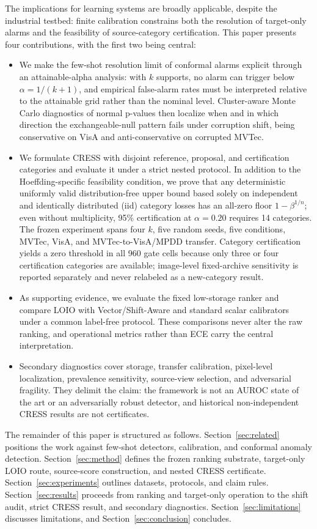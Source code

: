 The implications for learning systems are broadly applicable, despite the industrial testbed: finite calibration constrains both the resolution of target-only alarms and the feasibility of source-category certification. This paper presents four contributions, with the first two being central:
\begin{itemize}
    \item We make the few-shot resolution limit of conformal alarms explicit through an attainable-alpha analysis: with $k$ supports, no alarm can trigger below $\alpha=1/(k{+}1)$, and empirical false-alarm rates must be interpreted relative to the attainable grid rather than the nominal level. Cluster-aware Monte Carlo diagnostics of normal p-values then localize when and in which direction the exchangeable-null pattern fails under corruption shift, being conservative on VisA and anti-conservative on corrupted MVTec.
    \item We formulate CRESS with disjoint reference, proposal, and certification categories and evaluate it under a strict nested protocol. In addition to the Hoeffding-specific feasibility condition, we prove that any deterministic uniformly valid distribution-free upper bound based solely on independent and identically distributed (iid) category losses has an all-zero floor $1-\beta^{1/n}$; even without multiplicity, 95\% certification at $\alpha=0.20$ requires 14 categories. The frozen experiment spans four $k$, five random seeds, five conditions, MVTec, VisA, and MVTec-to-VisA/MPDD transfer. Category certification yields a zero threshold in all 960 gate cells because only three or four certification categories are available; image-level fixed-archive sensitivity is reported separately and never relabeled as a new-category result.
    \item As supporting evidence, we evaluate the fixed low-storage ranker and compare LOIO with Vector/Shift-Aware and standard scalar calibrators under a common label-free protocol. These comparisons never alter the raw ranking, and operational metrics rather than ECE carry the central interpretation.
    \item Secondary diagnostics cover storage, transfer calibration, pixel-level localization, prevalence sensitivity, source-view selection, and adversarial fragility. They delimit the claim: the framework is not an AUROC state of the art or an adversarially robust detector, and historical non-independent CRESS results are not certificates.
\end{itemize}

The remainder of this paper is structured as follows. Section~\ref{sec:related} positions the work against few-shot detectors, calibration, and conformal anomaly detection. Section~\ref{sec:method} defines the frozen ranking substrate, target-only LOIO route, source-score construction, and nested CRESS certificate. Section~\ref{sec:experiments} outlines datasets, protocols, and claim rules. Section~\ref{sec:results} proceeds from ranking and target-only operation to the shift audit, strict CRESS result, and secondary diagnostics. Section~\ref{sec:limitations} discusses limitations, and Section~\ref{sec:conclusion} concludes.
